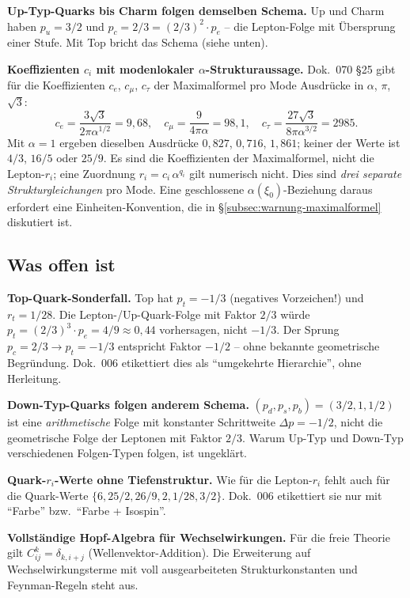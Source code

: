 \textbf{Up-Typ-Quarks bis Charm folgen demselben Schema.}
Up und Charm haben $p_u = 3/2$ und $p_c = 2/3 = (2/3)^2 \cdot p_e$
-- die Lepton-Folge mit Übersprung einer Stufe. Mit Top bricht
das Schema (siehe unten).

\textbf{Koeffizienten $c_i$ mit modenlokaler $\alpha$-Strukturaussage.}
Dok.~070 §25 gibt für die Koeffizienten $c_e$, $c_\mu$, $c_\tau$ der
Maximalformel pro Mode Ausdrücke in $\alpha$, $\pi$, $\sqrt{3}$:
\begin{equation}
  c_e = \frac{3\sqrt{3}}{2\pi\alpha^{1/2}} = 9{,}68, \quad
  c_\mu = \frac{9}{4\pi\alpha} = 98{,}1, \quad
  c_\tau = \frac{27\sqrt{3}}{8\pi\alpha^{3/2}} = 2985.
\end{equation}
Mit $\alpha = 1$ ergeben dieselben Ausdrücke $0{,}827$, $0{,}716$, $1{,}861$; keiner der Werte ist $4/3$, $16/5$ oder $25/9$. Es sind die Koeffizienten der Maximalformel, nicht die Lepton-$r_i$; eine Zuordnung $r_i = c_i\,\alpha^{q_i}$ gilt numerisch nicht.
Dies sind \emph{drei separate Strukturgleichungen} pro Mode. Eine
geschlossene $\alpha(\xi_0)$-Beziehung daraus erfordert eine
Einheiten-Konvention, die in §\ref{subsec:warnung-maximalformel}
diskutiert ist.

\subsection{Was offen ist}

\textbf{Top-Quark-Sonderfall.}
Top hat $p_t = -1/3$ (negatives Vorzeichen!) und $r_t = 1/28$.
Die Lepton-/Up-Quark-Folge mit Faktor $2/3$ würde $p_t = (2/3)^3 \cdot
p_e = 4/9 \approx 0{,}44$ vorhersagen, nicht $-1/3$. Der Sprung
$p_c = 2/3 \to p_t = -1/3$ entspricht Faktor $-1/2$ -- ohne bekannte
geometrische Begründung. Dok.~006 etikettiert dies als
\enquote{umgekehrte Hierarchie}, ohne Herleitung.

\textbf{Down-Typ-Quarks folgen anderem Schema.}
$(p_d, p_s, p_b) = (3/2, 1, 1/2)$ ist eine \emph{arithmetische} Folge
mit konstanter Schrittweite $\Delta p = -1/2$, nicht die geometrische
Folge der Leptonen mit Faktor $2/3$. Warum Up-Typ und Down-Typ
verschiedenen Folgen-Typen folgen, ist ungeklärt.

\textbf{Quark-$r_i$-Werte ohne Tiefenstruktur.}
Wie für die Lepton-$r_i$ fehlt auch für die
Quark-Werte $\{6, 25/2, 26/9, 2, 1/28, 3/2\}$. Dok.~006 etikettiert
sie nur mit \enquote{Farbe} bzw.\ \enquote{Farbe + Isospin}.

\textbf{Vollständige Hopf-Algebra für Wechselwirkungen.}
Für die freie Theorie gilt $C^k_{ij} = \delta_{k,i+j}$
(Wellenvektor-Addition). Die Erweiterung auf Wechselwirkungsterme
mit voll ausgearbeiteten Strukturkonstanten und Feynman-Regeln steht
aus.

